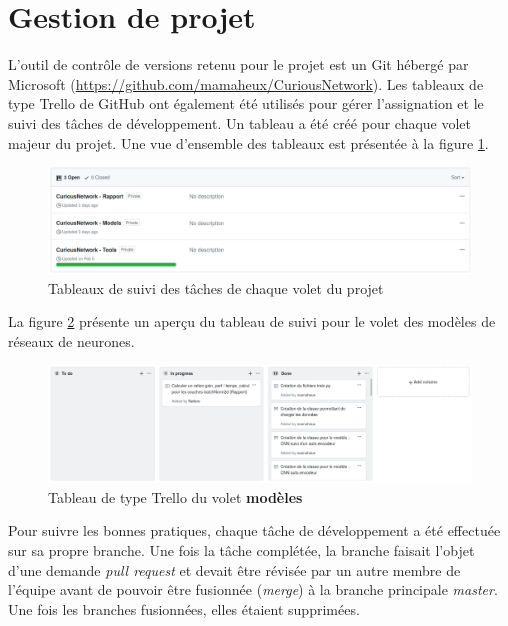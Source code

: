 \section{Gestion de projet}
    L'outil de contrôle de versions retenu pour le projet est un Git hébergé par Microsoft (\url{https://github.com/mamaheux/CuriousNetwork}). Les tableaux de type Trello de GitHub ont également été utilisés pour gérer l'assignation et le suivi des tâches de développement. Un tableau a été créé pour chaque volet majeur du projet. Une vue d'ensemble des tableaux est présentée à la figure \ref{fig:trello_boards}.

    \begin{figure}[H]
        \centering
        \includegraphics[width=15cm]{images/3_sub_projects.png}
        \caption{Tableaux de suivi des tâches de chaque volet du projet}
        \label{fig:trello_boards}
    \end{figure}

    La figure \ref{fig:trello_board_models} présente un aperçu du tableau de suivi pour le volet des modèles de réseaux de neurones.
    \begin{figure}[H]
        \centering
        \includegraphics[width=15cm]{images/trello_board.png}
        \caption[Tableau de type Trello du volet modèles]{Tableau de type Trello du volet \textbf{modèles}}
        \label{fig:trello_board_models}
    \end{figure}

    Pour suivre les bonnes pratiques, chaque tâche de développement a été effectuée sur sa propre branche. Une fois la tâche complétée, la branche faisait l'objet d'une demande \textit{pull request} et devait être révisée par un autre membre de l'équipe avant de pouvoir être fusionnée (\textit{merge}) à la branche principale \textit{master}. Une fois les branches fusionnées, elles étaient supprimées.
    \bigskip
    
